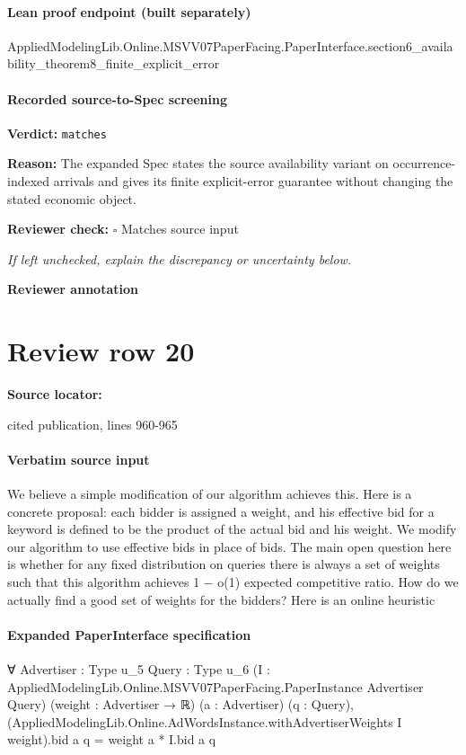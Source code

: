 \documentclass[10pt]{article}
\newcommand{\reviewerbox}{%
  \par\noindent\fbox{\parbox{0.96\linewidth}{\rule{0pt}{0.38in}}}\par
}
\newcommand{\reviewmatch}[1]{%
  \par\noindent\textbf{Reviewer check:} $\square$\; #1\par
  \noindent\emph{If left unchecked, explain the discrepancy or uncertainty below.}\par
}
\begin{document}
\paragraph{Lean proof endpoint (built separately)}\begin{ReviewVerbatim}
AppliedModelingLib.Online.MSVV07PaperFacing.PaperInterface.section6_availability_theorem8_finite_explicit_error
\end{ReviewVerbatim}

\paragraph{Recorded source-to-Spec screening}
\textbf{Verdict:} \texttt{matches}
\\
{\raggedright
\textbf{Reason:} The expanded Spec states the source availability variant on occurrence-\allowbreak{}indexed arrivals and gives its finite explicit-\allowbreak{}error guarantee without changing the stated economic object.\allowbreak{}
\par}
\reviewmatch{Matches source input}
\noindent\textbf{Reviewer annotation}\par
\reviewerbox
\clearpage
\hypertarget{source-claim-d1d74774d9ee75ce}{}
\section*{Review row 20}
\textbf{Source locator:} {\footnotesize\raggedright cited publication, lines 960-\allowbreak{}965\par}
\paragraph{Verbatim source input}
\begin{ReviewVerbatim}
We believe a simple modification of our algorithm achieves this. Here is a concrete proposal:
each bidder is assigned a weight, and his effective bid for a keyword is defined to be the product
of the actual bid and his weight. We modify our algorithm to use effective bids in place of
bids. The main open question here is whether for any fixed distribution on queries there is
always a set of weights such that this algorithm achieves 1 − o(1) expected competitive ratio.
How do we actually find a good set of weights for the bidders? Here is an online heuristic
\end{ReviewVerbatim}



\paragraph{Expanded PaperInterface specification}
\begin{ReviewVerbatim}
∀ {Advertiser : Type u_5} {Query : Type u_6}
  (I : AppliedModelingLib.Online.MSVV07PaperFacing.PaperInstance Advertiser Query) (weight : Advertiser → ℝ)
  (a : Advertiser) (q : Query),
  (AppliedModelingLib.Online.AdWordsInstance.withAdvertiserWeights I weight).bid a q = weight a * I.bid a q
\end{ReviewVerbatim}
\end{document}

